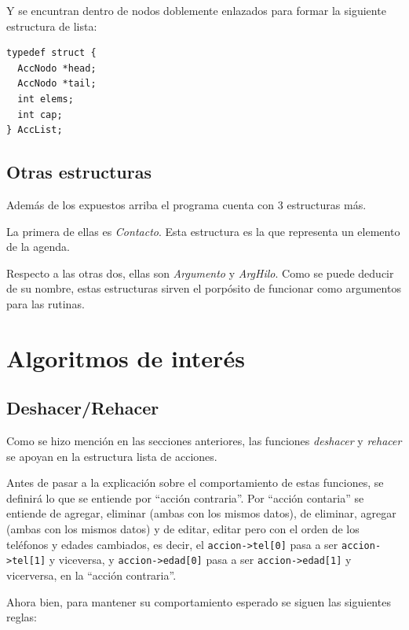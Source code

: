 \documentclass[11pt]{article}
\begin{document}
Y se encuntran dentro de nodos doblemente enlazados para formar la siguiente estructura de lista:

\begin{lstlisting}[style = CStyle]
typedef struct {
  AccNodo *head;
  AccNodo *tail;
  int elems;
  int cap;
} AccList;
\end{lstlisting}

\subsection{Otras estructuras}

Adem\'as de los expuestos arriba el programa cuenta con 3 estructuras m\'as. 

La primera de ellas es \emph{Contacto}. Esta estructura es la que representa un elemento de la agenda. 

Respecto a las otras dos, ellas son \emph{Argumento} y \emph{ArgHilo}. Como se puede deducir de su nombre, estas estructuras 
sirven el porp\'osito de funcionar como argumentos para las rutinas.

\section{Algoritmos de inter\'es}

    \subsection{Deshacer/Rehacer}
    Como se hizo menci\'on en las secciones anteriores, las funciones \emph{deshacer} y \emph{rehacer} se apoyan en la estructura lista de acciones.

    Antes de pasar a la explicaci\'on sobre el comportamiento de estas funciones, se definir\'a lo que se entiende por ``acci\'on contraria''. Por ``acci\'on contaria'' se entiende de agregar, eliminar (ambas con los mismos datos), 
    de eliminar, agregar (ambas con los mismos datos) y de editar, editar pero con el orden de los tel\'efonos y edades cambiados, es decir, el \verb|accion->tel[0]| pasa a ser \verb|accion->tel[1]| y viceversa, y \verb|accion->edad[0]| pasa a ser \verb|accion->edad[1]| y vicerversa, en la ``acci\'on contraria''.

    Ahora bien, para mantener su comportamiento esperado se siguen las siguientes reglas:
\end{document}
